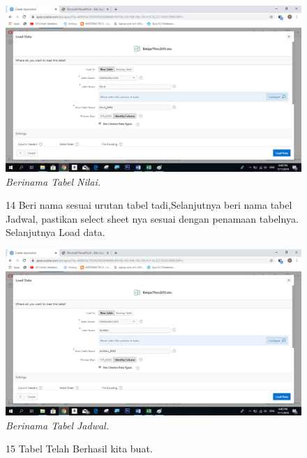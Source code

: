 \begin{enumerate}
\begin{figure}
    \begin{center}
\includegraphics[scale=0.4]{figures/13.png}
    \caption{\textit{Berinama Tabel Nilai.}}
        \end{center}
\label{gambar}
\end{figure}

\begin{figure}
\item[14]Beri nama sesuai urutan tabel tadi,Selanjutnya beri nama tabel Jadwal, pastikan select sheet nya sesuai dengan penamaan tabelnya. Selanjutnya Load data. 

    \begin{center}
\includegraphics[scale=0.6]{figures/14.png}
    \caption{\textit{Berinama Tabel Jadwal.}}
        \end{center}
\label{gambar}
\end{figure}

\begin{figure}
\item[15]Tabel Telah Berhasil kita buat.


\end{figure}
\end{enumerate}
